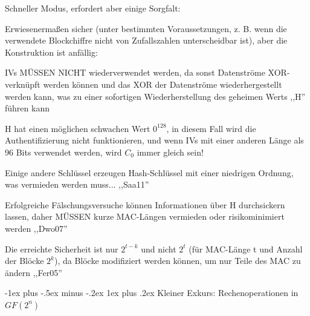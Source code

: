 \documentclass[a4paper]{article}
\makeatletter
\renewcommand{\subsubsection}{\@startsection{subsubsection}{3}{0mm}%
 {-1ex plus -.5ex minus -.2ex}%
 {1ex plus .2ex}%
 {\normalfont\small\bfseries}}
\makeatother
\begin{document}
\begin{multicols}{3}
\begin{itemize*}
            \begin{itemize*}
                  \item Schneller Modus, erfordert aber einige Sorgfalt:
                  \begin{itemize*} \item Erwiesenermaßen sicher (unter bestimmten Voraussetzungen, z. B. wenn die verwendete Blockchiffre nicht von Zufallszahlen unterscheidbar ist), aber die Konstruktion ist anfällig: \end{itemize*}
                  \item IVs MÜSSEN NICHT wiederverwendet werden, da sonst Datenströme XOR-verknüpft werden können und das XOR der Datenströme wiederhergestellt werden kann, was zu einer sofortigen Wiederherstellung des geheimen Werts ,,H'' führen kann
                  \item H hat einen möglichen schwachen Wert $0^{128}$, in diesem Fall wird die Authentifizierung nicht funktionieren, und wenn IVs mit einer anderen Länge als 96 Bits verwendet werden, wird $C_0$ immer gleich sein!
                  \item Einige andere Schlüssel erzeugen Hash-Schlüssel mit einer niedrigen Ordnung, was vermieden werden muss... ,,Saa11''
                  \item Erfolgreiche Fälschungsversuche können Informationen über H durchsickern lassen, daher MÜSSEN kurze MAC-Längen vermieden oder risikominimiert werden ,,Dwo07''
                  \item Die erreichte Sicherheit ist nur $2^{t-k}$ und nicht $2^t$ (für MAC-Länge t und Anzahl der Blöcke $2^k$), da Blöcke modifiziert werden können, um nur Teile des MAC zu ändern ,,Fer05''
            \end{itemize*}
      \end{itemize*}


      \subsubsection{Kleiner Exkurs: Rechenoperationen in
            $GF(2^n)$}


\end{multicols}
\end{document}
